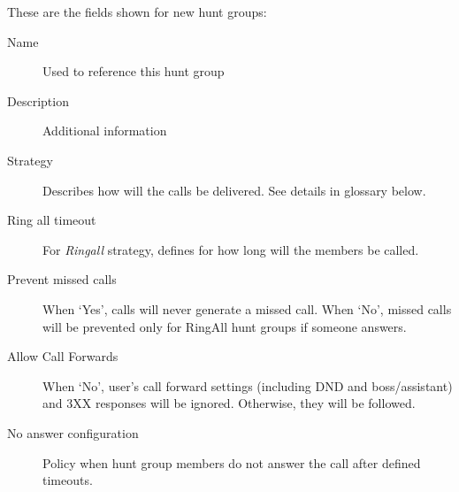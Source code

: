 \documentclass[letterpaper,10pt,english]{sphinxmanual}
\begin{document}
These are the fields shown for new hunt groups:
\begin{description}
\item[{Name}] \leavevmode{}\label{administration_portal/client/vpbx/routing_endpoints/hunt_groups:term-name}
Used to reference this hunt group

\item[{Description}] \leavevmode{}\label{administration_portal/client/vpbx/routing_endpoints/hunt_groups:term-description}
Additional information

\item[{Strategy}] \leavevmode{}\label{administration_portal/client/vpbx/routing_endpoints/hunt_groups:term-strategy}
Describes how will the calls be delivered. See details in glossary below.

\item[{Ring all timeout}] \leavevmode{}\label{administration_portal/client/vpbx/routing_endpoints/hunt_groups:term-ring-all-timeout}
For \emph{Ringall} strategy, defines for how long will the members be called.

\item[{Prevent missed calls}] \leavevmode{}\label{administration_portal/client/vpbx/routing_endpoints/hunt_groups:term-prevent-missed-calls}
When `Yes', calls will never generate a missed call. When `No', missed calls will be prevented only for RingAll
hunt groups if someone answers.

\item[{Allow Call Forwards}] \leavevmode{}\label{administration_portal/client/vpbx/routing_endpoints/hunt_groups:term-allow-call-forwards}
When `No', user's call forward settings (including DND and boss/assistant) and 3XX responses will be ignored. Otherwise, they will be followed.

\item[{No answer configuration}] \leavevmode{}\label{administration_portal/client/vpbx/routing_endpoints/hunt_groups:term-no-answer-configuration}
Policy when hunt group members do not answer the call after defined timeouts.

\end{description}
\end{document}
